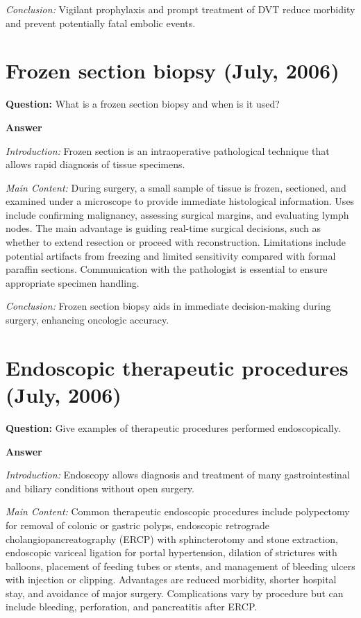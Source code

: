 \documentclass{article}
\begin{document}
\emph{Conclusion:} Vigilant prophylaxis and prompt treatment of DVT reduce morbidity and prevent potentially fatal embolic events.


\section{Frozen section biopsy (July, 2006)}


\textbf{Question:} What is a frozen section biopsy and when is it used?

\textbf{Answer}

\emph{Introduction:} Frozen section is an intraoperative pathological technique that allows rapid diagnosis of tissue specimens.

\emph{Main Content:} During surgery, a small sample of tissue is frozen, sectioned, and examined under a microscope to provide immediate histological information. Uses include confirming malignancy, assessing surgical margins, and evaluating lymph nodes. The main advantage is guiding real-time surgical decisions, such as whether to extend resection or proceed with reconstruction. Limitations include potential artifacts from freezing and limited sensitivity compared with formal paraffin sections. Communication with the pathologist is essential to ensure appropriate specimen handling.

\emph{Conclusion:} Frozen section biopsy aids in immediate decision-making during surgery, enhancing oncologic accuracy.


\section{Endoscopic therapeutic procedures (July, 2006)}


\textbf{Question:} Give examples of therapeutic procedures performed endoscopically.

\textbf{Answer}

\emph{Introduction:} Endoscopy allows diagnosis and treatment of many gastrointestinal and biliary conditions without open surgery.

\emph{Main Content:} Common therapeutic endoscopic procedures include polypectomy for removal of colonic or gastric polyps, endoscopic retrograde cholangiopancreatography (ERCP) with sphincterotomy and stone extraction, endoscopic variceal ligation for portal hypertension, dilation of strictures with balloons, placement of feeding tubes or stents, and management of bleeding ulcers with injection or clipping. Advantages are reduced morbidity, shorter hospital stay, and avoidance of major surgery. Complications vary by procedure but can include bleeding, perforation, and pancreatitis after ERCP.
\end{document}

